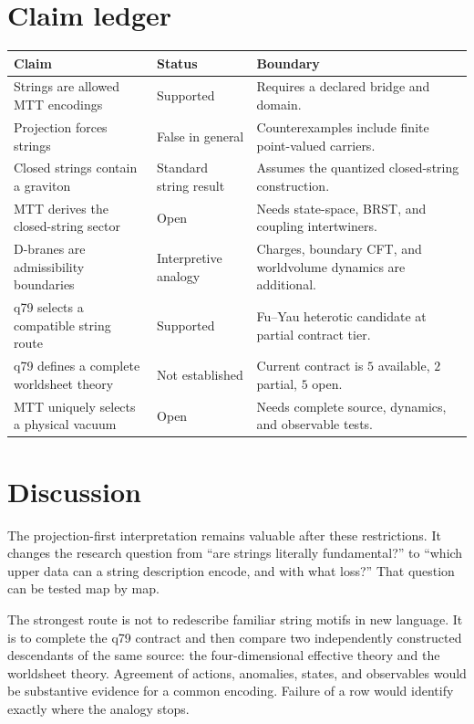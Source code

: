 \documentclass[11pt]{article}
\begin{document}
\section{Claim ledger}

\begin{center}
\small
\begin{tabularx}{\textwidth}{@{}p{}p{}X@{}}
\toprule
Claim & Status & Boundary\\
\midrule
Strings are allowed MTT encodings & Supported & Requires a declared bridge
and domain.\\
Projection forces strings & False in general & Counterexamples include
finite point-valued carriers.\\
Closed strings contain a graviton & Standard string result & Assumes the
quantized closed-string construction.\\
MTT derives the closed-string sector & Open & Needs state-space, BRST, and
coupling intertwiners.\\
D-branes are admissibility boundaries & Interpretive analogy & Charges,
boundary CFT, and worldvolume dynamics are additional.\\
q79 selects a compatible string route & Supported & Fu--Yau heterotic
candidate at partial contract tier.\\
q79 defines a complete worldsheet theory & Not established & Current
contract is \(5\) available, \(2\) partial, \(5\) open.\\
MTT uniquely selects a physical vacuum & Open & Needs complete source,
dynamics, and observable tests.\\
\bottomrule
\end{tabularx}
\end{center}

\section{Discussion}

The projection-first interpretation remains valuable after these
restrictions. It changes the research question from ``are strings literally
fundamental?'' to ``which upper data can a string description encode, and
with what loss?'' That question can be tested map by map.

The strongest route is not to redescribe familiar string motifs in new
language. It is to complete the q79 contract and then compare two
independently constructed descendants of the same source: the four-dimensional
effective theory and the worldsheet theory. Agreement of actions, anomalies,
states, and observables would be substantive evidence for a common encoding.
Failure of a row would identify exactly where the analogy stops.
\end{document}
